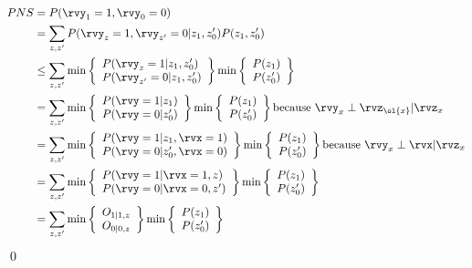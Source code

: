 \begin{align}
PNS&= P(\rvy_1=1, \rvy_0=0)
\\
&=
\sum_{z,z'}
P(\rvy_z=1, \rvy_{z'}=0|z_1, z'_0)P(z_1, z'_0)
\\
&\leq
\sum_{z,z'}
\min\left\{\begin{array}{l}
P(\rvy_z=1|z_1, z'_0)\\
P(\rvy_{z'}=0|z_1, z'_0)
\end{array}
\right\}
\min\left\{\begin{array}{l}
P(z_1)
\\
P(z'_0)
\end{array}
\right\}
\\
&=
\sum_{z,z'}
\min\left\{\begin{array}{l}
P(\rvy=1|z_1)\\
P(\rvy=0|z'_0)
\end{array}
\right\}
\min\left\{\begin{array}{l}
P(z_1)
\\
P(z'_0)
\end{array}
\right\}
\text{because $\rvy_x\perp\rvz_{\ol{x}}|\rvz_x$}
\\
&=
\sum_{z,z'}
\min\left\{\begin{array}{l}
P(\rvy=1|z_1,\rvx=1)\\
P(\rvy=0|z'_0,\rvx=0)
\end{array}
\right\}
\min\left\{\begin{array}{l}
P(z_1)
\\
P(z'_0)
\end{array}
\right\}
\text{because $\rvy_x\perp\rvx|\rvz_x$}
\\
&=
\sum_{z,z'}
\min\left\{\begin{array}{l}
P(\rvy=1|\rvx=1, z)\\
P(\rvy=0|\rvx=0, z')
\end{array}
\right\}
\min\left\{\begin{array}{l}
P(z_1)
\\
P(z'_0)
\end{array}
\right\}
\\
&=
\sum_{z,z'}
\min\left\{\begin{array}{l}
O_{1|1,z}\\
O_{0|0,z}
\end{array}
\right\}
\min\left\{\begin{array}{l}
P(z_1)
\\
P(z'_0)
\end{array}
\right\}
\end{align}
\qed

